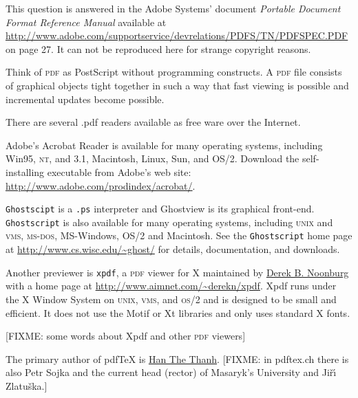 \documentclass{article}
\begin{document}
  This question is answered
  in the Adobe Systems' document \emph{Portable Document Format
    Reference Manual} available at
  \url{http://www.adobe.com/supportservice/devrelations/PDFS/TN/PDFSPEC.PDF}
  on page 27. It can not be reproduced here for strange copyright
  reasons.

  Think of \textsc{pdf} as PostScript without programming constructs. A \textsc{pdf}
  file consists of graphical objects tight together in such a way that
  fast viewing is possible and incremental updates become possible.


  There are several .pdf readers available as free ware over the
  Internet.

  Adobe's Acrobat Reader is available for many operating systems,
  including Win95, \textsc{nt}, and 3.1, Macintosh, Linux, Sun, and OS/2.
  Download the self-installing executable from Adobe's web site:
  \url{http://www.adobe.com/prodindex/acrobat/}.

  \verb+Ghostscipt+ is a \verb+.ps+ interpreter and Ghostview is its graphical
  front-end.  \verb+Ghostscript+ is also available for many operating
  systems, including \textsc{unix} and \textsc{vms}, \textsc{ms-dos}, MS-Windows, OS/2 and
  Macintosh.  See the \verb+Ghostscript+ home page at
  \url{http://www.cs.wisc.edu/~ghost/} for details, documentation, and
  downloads.

  Another previewer is \verb+xpdf+, a \textsc{pdf} viewer for X maintained by
  \href{mailto:derekn@aimnet.com}{Derek B. Noonburg} with a home page at
  \url{http://www.aimnet.com/~derekn/xpdf}. Xpdf runs under the X
  Window System on \textsc{unix, vms}, and \textsc{os}/2 and is designed
  to be small and  efficient.  It does not use the Motif or Xt libraries
  and only uses standard X fonts.

  [FIXME: some words about Xpdf and other \textsc{pdf} viewers]



  The primary author of pdf\TeX{} is
  \href{mailto:thanh@fi.muni.cz}{Han The Thanh}. [FIXME: in pdftex.ch there is also
  Petr Sojka and the current head (rector) of Masaryk's University and
  Ji\v{r}\'{\i} Zlatu\v{s}ka.]
\end{document}
